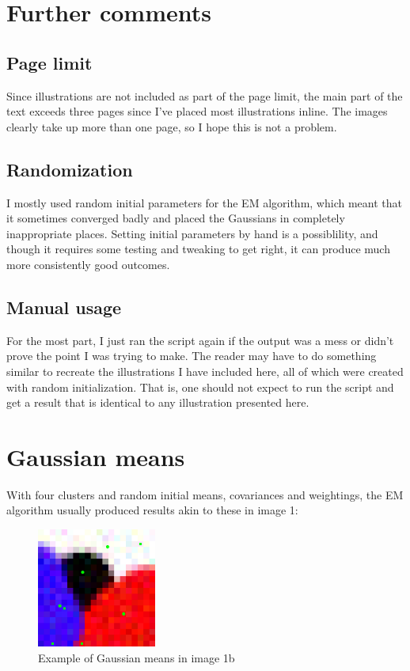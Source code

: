 \documentclass[letterpaper, 10pt, twocolumn]{article}
\numberwithin{theorem}{section}
\begin{document}
\section{Further comments}
\subsection{Page limit}
Since illustrations are not included as part of the page limit, the main part of the text exceeds three pages since I've placed most illustrations inline.
The images clearly take up more than one page, so I hope this is not a problem.

\subsection{Randomization}
I mostly used random initial parameters for the EM algorithm, which meant that it sometimes converged badly and placed the Gaussians in completely inappropriate places.
Setting initial parameters by hand is a possiblility, and though it requires some testing and tweaking to get right, it can produce much more consistently good outcomes.

\subsection{Manual usage}
For the most part, I just ran the script again if the output was a mess or didn't prove the point I was trying to make.
The reader may have to do something similar to recreate the illustrations I have included here, all of which were created with random initialization. 
That is, one should not expect to run the script and get a result that is identical to any illustration presented here.


\appendix

\clearpage
\section{Gaussian means}
With four clusters and random initial means, covariances and weightings, the EM algorithm usually produced results akin to these in image 1:

\begin{figure}[h]
	\centering
	\includegraphics[width=0.35\textwidth]{1b-means}
	\caption{Example of Gaussian means in image 1b}
	\label{fig:1b-means}
\end{figure}
\end{document}
